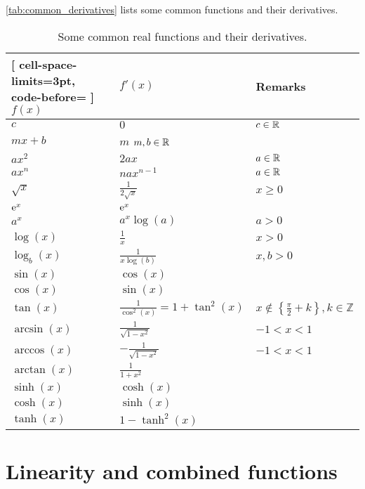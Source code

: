 \autoref{tab:common_derivatives} lists some common functions and their derivatives.
\begin{table}[htpb]
	\centering
	\caption{Some common real functions and their derivatives.}
	\label{tab:common_derivatives}
	\begin{NiceTabular}{lll}[
			cell-space-limits=3pt, code-before= 
		]
		\toprule
    \RowStyle{\bfseries} $f(x)$ & $f'(x)$ & Remarks\\
		\midrule
    $c$ & $0$ & $c\in\mathbb{R}^{}$\\
    $mx+b$ & $m$ $m,b\in\mathbb{R}^{}$\\
    $ax^{2}$ & $2ax$ & $a\in\mathbb{R}^{}$ \\
    $ax^{n}$ & $nax^{n-1}$ & $a\in\mathbb{R}^{}$\\
    $\sqrt{x}$ & $\frac{1}{2\sqrt{x}}$ & $x\geq0$\\
    $\mathrm{e}^{x}$ & $\mathrm{e}^{x}$ &\\
    $a^{x}$ & $a^{x}\log(a)$ & $a>0$\\
    $\log(x)$ & $\frac{1}{x}$ & $x>0$\\
    $\log_{b}(x)$ & $\frac{1}{x\log(b)}$ & $x,b>0$\\
    $\sin(x)$ & $\cos(x)$ & \\
    $\cos(x)$ & $\sin(x)$ & \\
    $\tan(x)$ & $\frac{1}{\cos^{2}(x)}=1+\tan^{2}(x)$ & $x\notin\left\{\frac{\pi}{2}+k\right\},k\in\mathbb{Z}$\\
    $\arcsin(x)$ & $\frac{1}{\sqrt{1-x^{2}}}$ & $-1<x<1$\\
    $\arccos(x)$ & $-\frac{1}{\sqrt{1-x^{2}}}$ & $-1<x<1$ \\
    $\arctan(x)$ & $\frac{1}{1+x^{2}}$ & \\
    $\sinh(x)$ & $\cosh(x)$ & \\
    $\cosh(x)$ & $\sinh(x)$ & \\
    $\tanh(x)$ & $1-\tanh^{2}(x)$ & \\
		\bottomrule
	\end{NiceTabular}
\end{table}

\section{Linearity and combined functions}
\label{sec:section name}
